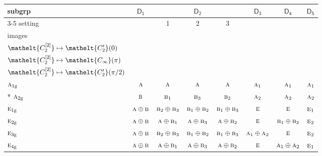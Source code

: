\documentclass[10pt,a4paper]{article}
\numberwithin{equation}{section}
\newcommand{\eltfont}[1]{{\let\sigma\eltsigma\mathelt{#1}}}
\newcommand{\grp}[1]{\mathsf{#1}}
\newcommand{\irr}[1]{\text{\normalfont\scshape #1}}
\newcommand{\cls}[1]{\eltfont{#1}}
\newcommand{\elt}[1]{\eltfont{#1}}
\newcommand{\ptag}[1]{\mathrm{#1}}
\newcommand{\genidx}[2]{#1^{[\mathrm{#2}]}}
\begin{document}
{\small\begin{longtable}{@{}lccccccc@{}}\toprule
subgrp & \href{D1.pdf}{$\grp{D_{1}}$} & \multicolumn{3}{c}{\href{D2.pdf}{$\grp{D_{2}}$}} & \href{D3.pdf}{$\grp{D_{3}}$} & \href{D4.pdf}{$\grp{D_{4}}$} & \href{D5.pdf}{$\grp{D_{5}}$}\\\cmidrule(lr){3-5}
setting &  & 1 & 2 & 3 &  &  & \\
images &  & {\scriptsize\begin{tabular}[t]{@{}c@{}}$\cls{\genidx{C_{2}}{1}} \mapsto \elt{C_{\infty}}(\pi)$\\$\cls{\genidx{C_{2}}{2}} \mapsto \elt{C_2'}(0)$\end{tabular}} & {\scriptsize\begin{tabular}[t]{@{}c@{}}$\cls{\genidx{C_{2}}{1}} \mapsto \elt{C_2'}(0)$\\$\cls{\genidx{C_{2}}{2}} \mapsto \elt{C_{\infty}}(\pi)$\end{tabular}} & {\scriptsize\begin{tabular}[t]{@{}c@{}}$\cls{\genidx{C_{2}}{1}} \mapsto \elt{C_2'}(0)$\\$\cls{\genidx{C_{2}}{2}} \mapsto \elt{C_2'}(\pi/2)$\end{tabular}} &  &  & \\\midrule\endhead
\bottomrule\endfoot\endlastfoot
$\irr{a}_{1\ptag{g}}$ & $\irr{a}$ & $\irr{a}$ & $\irr{a}$ & $\irr{a}$ & $\irr{a}_{1}$ & $\irr{a}_{1}$ & $\irr{a}_{1}$\\*
$\irr{a}_{2\ptag{g}}$ & $\irr{b}$ & $\irr{b}_{1}$ & $\irr{b}_{3}$ & $\irr{b}_{2}$ & $\irr{a}_{2}$ & $\irr{a}_{2}$ & $\irr{a}_{2}$\\
$\irr{e}_{1\ptag{g}}$ & $\irr{a}\oplus \irr{b}$ & $\irr{b}_{2}\oplus \irr{b}_{3}$ & $\irr{b}_{1}\oplus \irr{b}_{2}$ & $\irr{b}_{1}\oplus \irr{b}_{3}$ & $\irr{e}$ & $\irr{e}$ & $\irr{e}_{1}$\\
$\irr{e}_{2\ptag{g}}$ & $\irr{a}\oplus \irr{b}$ & $\irr{a}\oplus \irr{b}_{1}$ & $\irr{a}\oplus \irr{b}_{3}$ & $\irr{a}\oplus \irr{b}_{2}$ & $\irr{e}$ & $\irr{b}_{1}\oplus \irr{b}_{2}$ & $\irr{e}_{2}$\\
$\irr{e}_{3\ptag{g}}$ & $\irr{a}\oplus \irr{b}$ & $\irr{b}_{2}\oplus \irr{b}_{3}$ & $\irr{b}_{1}\oplus \irr{b}_{2}$ & $\irr{b}_{1}\oplus \irr{b}_{3}$ & $\irr{a}_{1}\oplus \irr{a}_{2}$ & $\irr{e}$ & $\irr{e}_{2}$\\
$\irr{e}_{4\ptag{g}}$ & $\irr{a}\oplus \irr{b}$ & $\irr{a}\oplus \irr{b}_{1}$ & $\irr{a}\oplus \irr{b}_{3}$ & $\irr{a}\oplus \irr{b}_{2}$ & $\irr{e}$ & $\irr{a}_{1}\oplus \irr{a}_{2}$ & $\irr{e}_{1}$\\

\end{longtable}}
\end{document}
